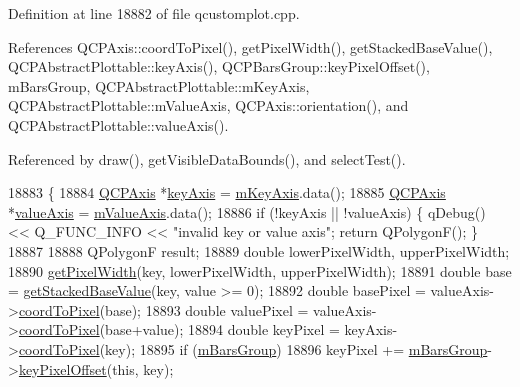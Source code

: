 Definition at line 18882 of file qcustomplot.\+cpp.



References Q\+C\+P\+Axis\+::coord\+To\+Pixel(), get\+Pixel\+Width(), get\+Stacked\+Base\+Value(), Q\+C\+P\+Abstract\+Plottable\+::key\+Axis(), Q\+C\+P\+Bars\+Group\+::key\+Pixel\+Offset(), m\+Bars\+Group, Q\+C\+P\+Abstract\+Plottable\+::m\+Key\+Axis, Q\+C\+P\+Abstract\+Plottable\+::m\+Value\+Axis, Q\+C\+P\+Axis\+::orientation(), and Q\+C\+P\+Abstract\+Plottable\+::value\+Axis().



Referenced by draw(), get\+Visible\+Data\+Bounds(), and select\+Test().


\begin{DoxyCode}
18883 \{
18884   \hyperlink{class_q_c_p_axis}{QCPAxis} *\hyperlink{class_q_c_p_abstract_plottable_a72c7a09c22963f2c943f07112b311103}{keyAxis} = \hyperlink{class_q_c_p_abstract_plottable_a426f42e254d0f8ce5436a868c61a6827}{mKeyAxis}.data();
18885   \hyperlink{class_q_c_p_axis}{QCPAxis} *\hyperlink{class_q_c_p_abstract_plottable_a3106f9d34d330a6097a8ec5905e5b519}{valueAxis} = \hyperlink{class_q_c_p_abstract_plottable_a2901452ca4aea911a1827717934a4bda}{mValueAxis}.data();
18886   \textcolor{keywordflow}{if} (!keyAxis || !valueAxis) \{ qDebug() << Q\_FUNC\_INFO << \textcolor{stringliteral}{"invalid key or value axis"}; \textcolor{keywordflow}{return} QPolygonF();
       \}
18887   
18888   QPolygonF result;
18889   \textcolor{keywordtype}{double} lowerPixelWidth, upperPixelWidth;
18890   \hyperlink{class_q_c_p_bars_a794eefe4fb29b9b40583654ccbf460dc}{getPixelWidth}(key, lowerPixelWidth, upperPixelWidth);
18891   \textcolor{keywordtype}{double} base = \hyperlink{class_q_c_p_bars_ae9b0c2fad9f29030c84bb6e62a4b605f}{getStackedBaseValue}(key, value >= 0);
18892   \textcolor{keywordtype}{double} basePixel = valueAxis->\hyperlink{class_q_c_p_axis_a985ae693b842fb0422b4390fe36d299a}{coordToPixel}(base);
18893   \textcolor{keywordtype}{double} valuePixel = valueAxis->\hyperlink{class_q_c_p_axis_a985ae693b842fb0422b4390fe36d299a}{coordToPixel}(base+value);
18894   \textcolor{keywordtype}{double} keyPixel = keyAxis->\hyperlink{class_q_c_p_axis_a985ae693b842fb0422b4390fe36d299a}{coordToPixel}(key);
18895   \textcolor{keywordflow}{if} (\hyperlink{class_q_c_p_bars_a9f59c255f3739182ca9744dff75beaa9}{mBarsGroup})
18896     keyPixel += \hyperlink{class_q_c_p_bars_a9f59c255f3739182ca9744dff75beaa9}{mBarsGroup}->\hyperlink{class_q_c_p_bars_group_a8e2ca6002e7bab49670144d048a2bcc9}{keyPixelOffset}(\textcolor{keyword}{this}, key);

\end{DoxyCode}
